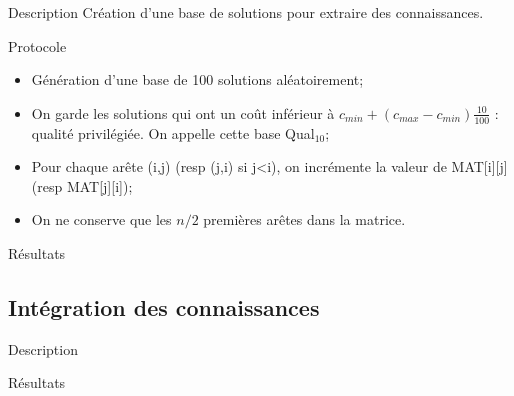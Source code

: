 \documentclass{beamer}
\begin{document}
\begin{frame}{Description}
Création d'une base de solutions pour extraire des connaissances.
\begin{block}{Protocole}
\begin{itemize}
\item Génération d'une base de 100 solutions aléatoirement;
\item On garde les solutions qui ont un coût inférieur à $c_{min} + (c_{max}-c_{min})\frac{10}{100}$ : qualité privilégiée. On appelle cette base Qual$_{10}$;
\item Pour chaque arête (i,j) (resp (j,i) si j<i), on incrémente la valeur de MAT[i][j] (resp MAT[j][i]);
\item On ne conserve que les $n/2$ premières arêtes dans la matrice.
\end{itemize}
\end{block}
\end{frame}

\begin{frame}{Résultats}

\end{frame}

\subsection{Intégration des connaissances}

\begin{frame}{Description}

\end{frame}

\begin{frame}{Résultats}

\end{frame}
\end{document}
